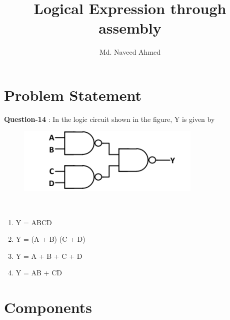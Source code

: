 \documentclass[journal,12pt,twocolumn]{IEEEtran}
\begin{document}
%

\theoremstyle{definition}
\newtheorem{theorem}{Theorem}[section]
\newtheorem{problem}{Problem}
\newtheorem{proposition}{Proposition}[section]
\newtheorem{lemma}{Lemma}[section]
\newtheorem{corollary}[theorem]{Corollary}
\newtheorem{example}{Example}[section]
\newtheorem{definition}{Definition}[section]
\newcommand{\BEQA}{\begin{eqnarray}}
\newcommand{\EEQA}{\end{eqnarray}}
\newcommand{\define}{\stackrel{\triangle}{=}}
\vspace{2cm}
\title{ 
Logical Expression through assembly
}

\author{Md. Naveed Ahmed}


\maketitle
\tableofcontents
\bigskip
%
\section{Problem Statement}



\textbf{Question-14}  : In the logic circuit shown in the figure, Y is given by
\begin{figure}[h]
    \centering
    \includegraphics[scale=0.8]{../figures/log_exp.png}\\
\end{figure}\\
\begin{enumerate}[label=(\alph*)]
    \item Y = ABCD
    \item Y = (A + B) (C + D)
    \item Y = A + B + C + D
    \item Y = AB + CD
\end{enumerate}

\section{\textbf{Components}}

\begin{table}[!h]
\centering
\caption{}
\label{table:7447_disp}
\end{table}
\end{document}
